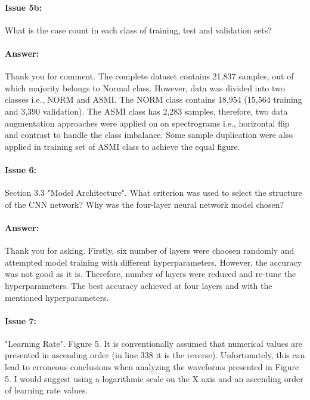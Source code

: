 \documentclass{article}
\begin{document}
\paragraph{Issue 5b:}
\begin{displayquote}
What is the case count in each class of training, test and validation sets?
\end{displayquote}

\paragraph{Answer:}
Thank you for comment. The complete dataset contains 21,837 samples, out of which majority belongs to Normal class. However, data was divided into two classes i.e., NORM and ASMI. The NORM class contains 18,954 (15,564 training and 3,390 validation). The ASMI class has 2,283 samples, therefore, two data augmentation approaches were applied on on spectrograms i.e., horizontal flip and contrast to handle the class imbalance. Some sample duplication were also applied in training set of ASMI class to achieve the equal figure.  

\paragraph{Issue 6:}
\begin{displayquote}
Section 3.3 "Model Architecture". What criterion was used to select the structure of the CNN network? Why was the four-layer neural network model chosen?
\end{displayquote}

\paragraph{Answer:}
Thank you for asking. Firstly, six number of layers were choosen randomly and attempted model training with different hyperparameters. However, the accuracy was not good as it is. Therefore, number of layers were reduced and re-tune the hyperparameters. The best accuracy achieved at four layers and with the mentioned hyperparameters. 

\paragraph{Issue 7:}
\begin{displayquote}
"Learning Rate". Figure 5. It is conventionally assumed that numerical values are presented in ascending order (in line 338 it is the reverse). Unfortunately, this can lead to erroneous conclusions when analyzing the waveforms presented in Figure 5. I would suggest using a logarithmic scale on the X axis and an ascending order of learning rate values. 
\end{displayquote}
\end{document}
